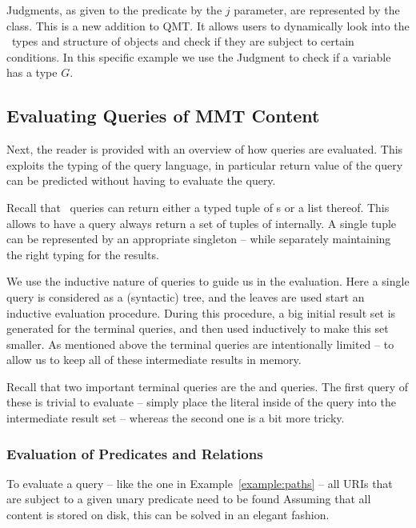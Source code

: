Judgments, as given to the predicate by the $j$ parameter, are represented by the  class.
This is a new addition to QMT. 
It allows users to dynamically look into the \mmt\ types and structure of objects and check if they are subject to certain conditions. 
In this specific example we use the  Judgment to check if a variable has a type $G$.

\subsection{Evaluating Queries of MMT Content}\label{sec:qmt:eval}

Next, the reader is provided with an overview of how queries are evaluated. 
This exploits the typing of the query language, in particular return value of the query can be predicted without having to evaluate the query.

Recall that \mmt\ queries can return either a typed tuple of s or a list thereof.
This allows to have a query always return a set of tuples of  internally. 
A single tuple  can be represented by an appropriate singleton -- while separately maintaining the right typing for the results.

We use the inductive nature of queries to guide us in the evaluation.
Here a single query is considered as a (syntactic) tree, and the leaves are used start an inductive evaluation procedure. 
During this procedure, a big initial result set is generated for the terminal queries, and then used inductively to make this set smaller.
As mentioned above the terminal queries are intentionally limited -- to allow us to keep all of these intermediate results in memory.

Recall that two important terminal queries are the  and  queries.
The first query of these is trivial to evaluate -- simply place the literal inside of the query into the intermediate result set -- whereas the second one is a bit more tricky.

\subsubsection*{Evaluation of Predicates and Relations}\label{sec:qmt:predeval}

To evaluate a  query -- like the one in Example~\ref{example:paths} -- all URIs that are subject to a given unary predicate need to be found
Assuming that all content is stored on disk, this can be solved in an elegant fashion.

